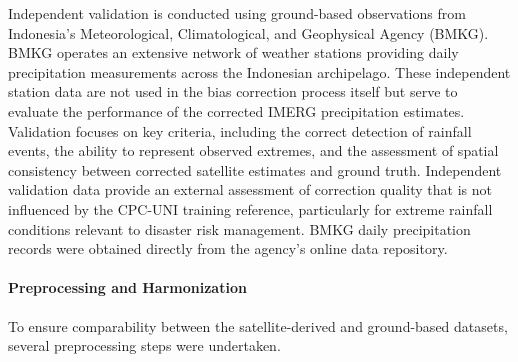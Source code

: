 \documentclass[11pt,a4paper]{article}
\begin{document}
Independent validation is conducted using ground-based observations from
Indonesia's Meteorological, Climatological, and Geophysical Agency
(BMKG). BMKG operates an extensive network of weather stations providing
daily precipitation measurements across the Indonesian archipelago.
These independent station data are not used in the bias correction
process itself but serve to evaluate the performance of the corrected
IMERG precipitation estimates. Validation focuses on key criteria,
including the correct detection of rainfall events, the ability to
represent observed extremes, and the assessment of spatial consistency
between corrected satellite estimates and ground truth. Independent
validation data provide an external assessment of correction quality
that is not influenced by the CPC-UNI training reference, particularly
for extreme rainfall conditions relevant to disaster risk management.
BMKG daily precipitation records were obtained directly from the
agency's online data repository.

\paragraph{Preprocessing and
Harmonization}\label{preprocessing-and-harmonization}

To ensure comparability between the satellite-derived and ground-based
datasets, several preprocessing steps were undertaken.
\end{document}
